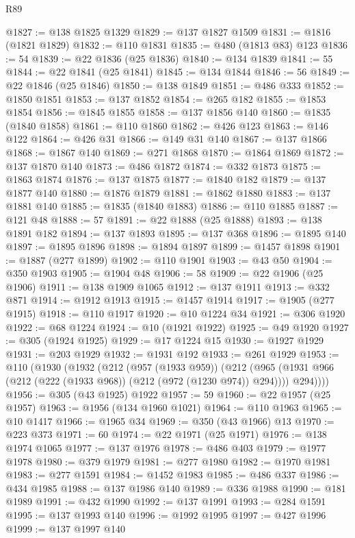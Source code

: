 \begin{lexlean}{R89}
\begin{coremodule}
@1827 := @138 @1825 @1329
@1829 := @137 @1827 @1509
@1831 := @1816 (@1821 @1829)
@1832 := @110 @1831
@1835 := @480 (@1813 @83) @123
@1836 := 54
@1839 := @22 @1836 (@25 @1836)
@1840 := @134 @1839
@1841 := 55
@1844 := @22 @1841 (@25 @1841)
@1845 := @134 @1844
@1846 := 56
@1849 := @22 @1846 (@25 @1846)
@1850 := @138 @1849
@1851 := @486 @333
@1852 := @1850 @1851
@1853 := @137 @1852
@1854 := @265 @182
@1855 := @1853 @1854
@1856 := @1845 @1855
@1858 := @137 @1856 @140
@1860 := @1835 (@1840 @1858)
@1861 := @110 @1860
@1862 := @426 @123
@1863 := @146 @122
@1864 := @426 @31
@1866 := @149 @31 @140
@1867 := @137 @1866
@1868 := @1867 @140
@1869 := @271 @1868
@1870 := @1864 @1869
@1872 := @137 @1870 @140
@1873 := @486 @1872
@1874 := @332 @1873
@1875 := @1863 @1874
@1876 := @137 @1875
@1877 := @1840 @182
@1879 := @137 @1877 @140
@1880 := @1876 @1879
@1881 := @1862 @1880
@1883 := @137 @1881 @140
@1885 := @1835 (@1840 @1883)
@1886 := @110 @1885
@1887 := @121 @48
@1888 := 57
@1891 := @22 @1888 (@25 @1888)
@1893 := @138 @1891 @182
@1894 := @137 @1893
@1895 := @137 @368
@1896 := @1895 @140
@1897 := @1895 @1896
@1898 := @1894 @1897
@1899 := @1457 @1898
@1901 := @1887 (@277 @1899)
@1902 := @110 @1901
@1903 := @43 @50
@1904 := @350 @1903
@1905 := @1904 @48
@1906 := 58
@1909 := @22 @1906 (@25 @1906)
@1911 := @138 @1909 @1065
@1912 := @137 @1911
@1913 := @332 @871
@1914 := @1912 @1913
@1915 := @1457 @1914
@1917 := @1905 (@277 @1915)
@1918 := @110 @1917
@1920 := @10 @1224 @34
@1921 := @306 @1920
@1922 := @68 @1224
@1924 := @10 (@1921 @1922)
@1925 := @49 @1920
@1927 := @305 (@1924 @1925)
@1929 := @17 @1224 @15
@1930 := @1927 @1929
@1931 := @203 @1929
@1932 := @1931 @192
@1933 := @261 @1929
@1953 := @110
    (@1930
      (@1932
        (@212
          (@957 (@1933 @959))
          (@212
            (@965 (@1931 @966 (@212 (@222 (@1933 @968)) (@212 (@972 (@1230 @974)) @294))))
            @294))))
@1956 := @305 (@43 @1925) @1922
@1957 := 59
@1960 := @22 @1957 (@25 @1957)
@1963 := @1956 (@134 @1960 @1021)
@1964 := @110 @1963
@1965 := @10 @1417
@1966 := @1965 @34
@1969 := @350 (@43 @1966) @13
@1970 := @223 @373
@1971 := 60
@1974 := @22 @1971 (@25 @1971)
@1976 := @138 @1974 @1065
@1977 := @137 @1976
@1978 := @486 @403
@1979 := @1977 @1978
@1980 := @379 @1979
@1981 := @277 @1980
@1982 := @1970 @1981
@1983 := @277 @1591
@1984 := @1452 @1983
@1985 := @486 @337
@1986 := @434 @1985
@1988 := @137 @1986 @140
@1989 := @336 @1988
@1990 := @181 @1989
@1991 := @432 @1990
@1992 := @137 @1991
@1993 := @284 @1591
@1995 := @137 @1993 @140
@1996 := @1992 @1995
@1997 := @427 @1996
@1999 := @137 @1997 @140

\end{coremodule}
\end{lexlean}
